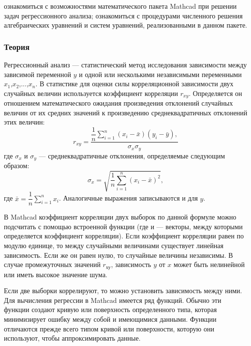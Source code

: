 
\goal ознакомиться с возможностями математического пакета Mathcad при решении задач регрессионного анализа; ознакомиться с процедурами численного решения алгебраических уравнений и систем уравнений, реализованными в данном пакете. 

\subsubsection*{Теория}
Регрессионный анализ --- статистический метод исследования зависимости между зависимой переменной $y$ и одной или несколькими независимыми переменными $x_1$,$x_2$,...,$x_n$.
В статистике для оценки силы корреляционной зависимости двух случайных величин используется коэффициент корреляции $r_{xy}$. Определяется он отношением математического ожидания произведения отклонений случайных величин от их средних значений к произведению среднеквадратичных отклонений этих величин:
\begin{equation}
r_{xy}=\dfrac{\dfrac{1}{n} \sum\limits_{i=1}^{n} (x_i-\bar{x}) (y_i-\bar{y}), }{\sigma_x \sigma_y}
\end{equation}
где $\sigma_x$ и $\sigma_y$ --- среднеквадратичные отклонения, определяемые следующим образом:
\begin{equation}
\sigma_x=\sqrt{\dfrac{1}{n} \sum\limits_{i=1}^{n}(x_i-\bar{x})^2},
\end{equation}
где $\bar{x}=\dfrac{1}{n} \sum\limits_{i=1}^{n} x_i$.
Аналогичные выражения записываются и для $y$.

В Mathcad коэффициент корреляции двух выборок по данной формуле можно подсчитать с помощью встроенной функции  (где  и  --- векторы, между которыми определяется коэффициент корреляции). Если коэффициент корреляции равен по модулю единице, то между случайными величинами существует линейная зависимость. Если же он равен нулю, то случайные величины независимы. В случае промежуточных значений $r_{ху}$, зависимость $y$ от $x$ может быть нелинейной или иметь высокое значение шума.

Если две выборки коррелируют, то можно установить зависимость между ними. Для вычисления регрессии в Mathcad имеется ряд функций. Обычно эти функции создают кривую или поверхность определенного типа, которая минимизирует ошибку между собой и имеющимися данными. Функции отличаются прежде всего типом кривой или поверхности, которую они используют, чтобы аппроксимировать данные.

